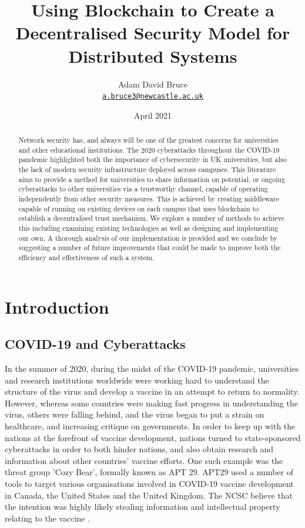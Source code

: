 \documentclass[a4paper, 11pt]{report}
\title{\Huge{\textbf{Using Blockchain to Create a Decentralised Security Model for Distributed Systems}}}
\date{April 2021}
\author{
\Large{Adam David Bruce} \\ \texttt{\href{mailto:a.bruce3@newcastle.ac.uk}{a.bruce3@newcastle.ac.uk}}}
\begin{document}
\maketitle

\begin{abstract}
Network security has, and always will be one of the greatest concerns for universities and other educational institutions. The 2020 cyberattacks throughout the COVID-19 pandemic highlighted both the importance of cybersecurity in UK universities, but also the lack of modern security infrastructure deployed across campuses. This literature aims to provide a method for universities to share information on potential, or ongoing cyberattacks to other universities via a trustworthy channel, capable of operating independently from other security measures. This is achieved by creating \gls{middleware} capable of running on existing devices on each campus that uses \gls{blockchain} to establish a decentralised trust mechanism. We explore a number of methods to achieve this including examining existing technologies as well as designing and implementing our own. A thorough analysis of our implementation is provided and we conclude by suggesting a number of future improvements that could be made to improve both the efficiency and effectiveness of such a system.
\end{abstract}

\tableofcontents
\listoffigures
\listoftables

\newpage

\chapter{Introduction}
\section{COVID-19 and Cyberattacks}
In the summer of 2020, during the midst of the COVID-19 pandemic, universities and research institutions worldwide were working hard to understand the structure of the virus and develop a vaccine in an attempt to return to normality. However, whereas some countries were making fast progress in understanding the virus, others were falling behind, and the virus began to put a strain on healthcare, and increasing critique on governments. In order to keep up with the nations at the forefront of vaccine development, nations turned to state-sponsored cyberattacks in order to both hinder nations, and also obtain research and information about other countries' vaccine efforts. One such example was the threat group 'Cozy Bear', formally known as \acrfull{APT} 29. \acrshort{APT}29 used a number of tools to target various organisations involved in COVID-19 vaccine development in Canada, the United States and the United Kingdom. The \acrfull{NCSC} believe that the intention was highly likely stealing information and intellectual property relating to the vaccine \cite{APT29}.
\end{document}

